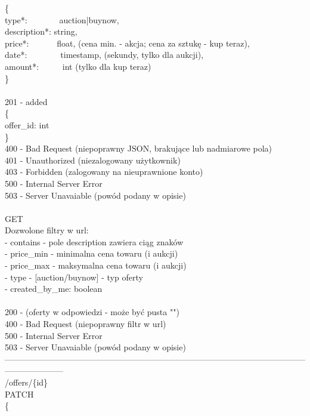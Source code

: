 \documentclass[12pt, notitlepage]{article}
\begin{document}
\begin{appendices}
{\{\\
\indent type*: \ \ \ \ \ \ \ \lbrack auction|buynow\rbrack,\\
\indent	description*:	string,\\
\indent	price*:	\ \ \ \ \ \ float, (cena min. - akcja; cena za sztukę - kup teraz),\\
\indent	date*:\ \ \ \ \ \ \ \ 	timestamp, (sekundy, tylko dla aukcji),\\
\indent	amount*: \ \ \ \ \ int (tylko dla kup teraz)\\
\}\\
\\
201 - added \\
	\{\\
    	\indent offer\_id: int\\
	\}\\
400 - Bad Request (niepoprawny JSON, brakujące lub nadmiarowe pola)\\
401 - Unauthorized (niezalogowany użytkownik)\\
403 - Forbidden (zalogowany na nieuprawnione konto)\\
500 - Internal Server Error\\
503 - Server Unavaiable (powód podany w opisie)\\
\\
GET\\
Dozwolone filtry w url:\\
- contains - pole description zawiera ciąg znaków\\
- price\_min - minimalna cena towaru (i aukcji)\\
- price\_max - maksymalna cena towaru (i aukcji)\\
- type - [auction/buynow] - typ oferty\\
- created\_by\_me: boolean\\
\\
200 - (oferty w odpowiedzi - może być pusta "\lbrack\rbrack")\\
400 - Bad Request (niepoprawny filtr w url)\\
500 - Internal Server Error\\
503 - Server Unavaiable (powód podany w opisie)\\
---------------------------------------------------------------------------------------------------------------------------------\\
/offers/\{id\}\\
PATCH\\
\{\\
}
\end{appendices}
\end{document}
